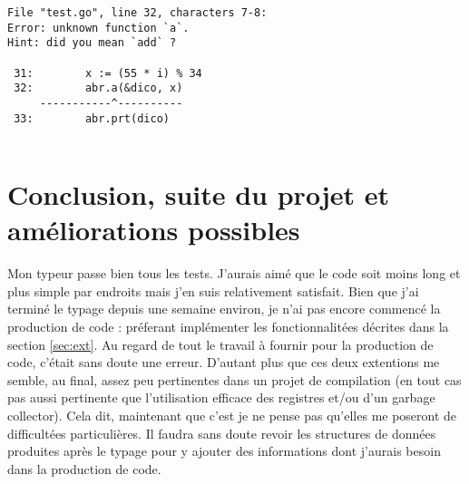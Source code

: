 \documentclass{article}
\begin{document}
\begin{verbatim}
File "test.go", line 32, characters 7-8:
Error: unknown function `a`.
Hint: did you mean `add` ?

 31:        x := (55 * i) % 34
 32:        abr.a(&dico, x)
     -----------^----------
 33:        abr.prt(dico)


\end{verbatim}

\section{Conclusion, suite du projet et améliorations possibles}

Mon typeur passe bien tous les tests. J'aurais aimé que le code soit moins long et plus simple par endroits mais j'en suis relativement satisfait. Bien que j'ai terminé le typage depuis une semaine environ, je n'ai pas encore commencé la production de code : préferant implémenter les fonctionnalitées décrites dans la section \ref{sec:ext}. Au regard de tout le travail à fournir pour la production de code, c'était sans doute une erreur. D'autant plus que ces deux extentions me semble, au final, assez peu pertinentes dans un projet de compilation (en tout cas pas aussi pertinente que l'utilisation efficace des registres et/ou d'un garbage collector). Cela dit, maintenant que c'est je ne pense pas qu'elles me poseront de difficultées particulières. Il faudra sans doute revoir les structures de données produites après le typage pour y ajouter des informations dont j'aurais besoin dans la production de code.
\end{document}
